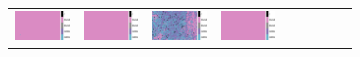\documentclass{ipol}
\begin{document}
\begin{figure}[ht]
\begin{subfigure}[t]{\linewidth}
\begin{tabular}{ccccccccc}
                \includegraphics[width=\s]{images/lake/AHD/iso_64_grids.png}&
                \includegraphics[width=\s]{images/lake/DCB/iso_64_grids.png}&
                \includegraphics[width=\s]{images/lake/DHT/iso_64_grids.png}&
                \includegraphics[width=\s]{images/lake/LINEAR/iso_64_grids.png}&

\end{tabular}
\end{subfigure}
\end{figure}
\end{document}
